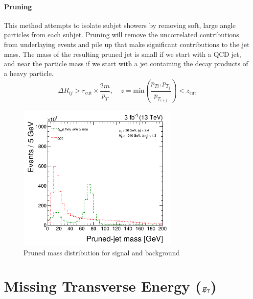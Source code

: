 \paragraph{Pruning}\label{prun}
This method attempts to isolate subjet showers by removing soft, large angle particles from each subjet. Pruning will remove the uncorrelated contributions from underlaying events and pile up that make significant contributions to the jet mass. The mass of the resulting pruned jet is small if we start with a QCD jet, and near the particle mass if we start with a jet containing the decay products of a heavy particle. 
\begin{eqnarray}
\Delta R_{ij}> r_{\text{cut}}\times\dfrac{2m}{p_{T}},\ \ \  \ \  z=\text{min}\left( \dfrac{p_{Ti}, p_{T_{j}}}{p_{T_{i+j}}} \right) < z_{\text{cut}}  
\end{eqnarray}

\begin{figure}[H]
\caption{Pruned mass distribution for signal and background \label{jetprunfigure}}
  \centering
\includegraphics[width=8cm]{physics_objects_plots/prun}
\end{figure}

\section{Missing Transverse Energy ($E_{\mathrm{T}}\hspace{-1.1em}/\kern0.45em$) }\label{MET1}

